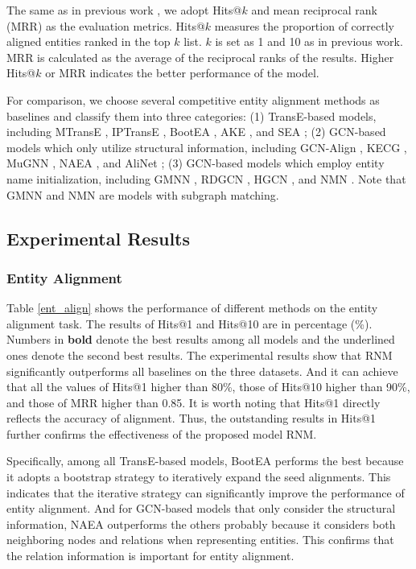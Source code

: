 \documentclass[letterpaper]{article} %
\begin{document}
The same as in previous work \cite{sun2018bootstrapping, yang2020cotsae},
we adopt Hits@$k$ and mean
reciprocal rank (MRR) as the evaluation metrics. Hits@$k$ measures
the proportion of correctly aligned entities ranked in the top $k$
list. $k$ is set as 1 and 10 as in previous work. MRR is calculated
as the average of the reciprocal ranks of the results. Higher
Hits@$k$ or MRR indicates the better performance of the model.

For comparison, we choose several competitive entity alignment
methods as baselines and classify them into three categories: (1)
TransE-based models, including MTransE \cite{chen2017multilingual},
IPTransE \cite{hao2017Iterative}, BootEA
\cite{sun2018bootstrapping}, AKE \cite{lin2019guiding},
and SEA \cite{pei2019semi}; (2) GCN-based
models which only utilize structural information, including GCN-Align \cite{wang2018cross}, KECG
\cite{li2019semi}, MuGNN \cite{cao2019multi}, NAEA
\cite{zhu2019neighborhood}, and AliNet \cite{sun2020knowledge};
(3) GCN-based models which employ entity name initialization,
including GMNN \cite{xu2019cross}, RDGCN \cite{wu2019relation}, HGCN
\cite{wu2019jointly},  and NMN \cite{wu2020neighborhood}.
Note that GMNN and NMN are models with subgraph matching.


\subsection{Experimental Results}

\subsubsection{Entity Alignment}

Table \ref{ent_align} shows the performance of different methods on
the entity alignment task. The results of Hits@1 and Hits@10 are in percentage (\%).
Numbers in \textbf{bold} denote the best
results among all models and the underlined ones denote the second
best results. The experimental results show that RNM significantly
outperforms all baselines on the three datasets. And it can achieve
that all the values of Hits@1 higher than 80\%, those of Hits@10
higher than 90\%, and those of MRR higher than 0.85. It is worth
noting that Hits@1 directly reflects the accuracy of alignment.
Thus, the outstanding results in Hits@1 further confirms the
effectiveness of the proposed model RNM.

Specifically, among all TransE-based models, BootEA performs the
best because it adopts a bootstrap strategy to iteratively
expand the seed alignments. This indicates that the iterative strategy can
significantly improve the performance of entity alignment.
And for GCN-based models that only consider the structural information,
NAEA outperforms the others probably because it considers both neighboring
nodes and relations when representing entities. This confirms
that the relation information is important for entity alignment.
\end{document}
